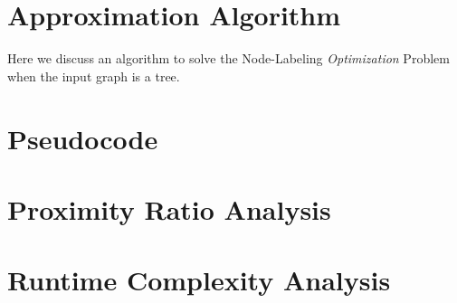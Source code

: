 \documentclass{article}
\begin{document}
\section{Approximation Algorithm}

Here we discuss an algorithm to solve the Node-Labeling \textit{Optimization} Problem when the input graph is a tree.


\section{Pseudocode}

\begin{algorithm}[H]
\caption{}
\KwIn{}
\KwOut{}
\BlankLine

\end{algorithm}

\section{Proximity Ratio Analysis}



\section{Runtime Complexity Analysis}
\end{document}
